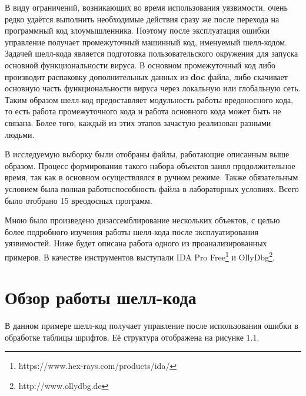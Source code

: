 В виду ограничений, возникающих во время использования уязвимости, очень редко удаётся выполнить необходимые действия сразу же после перехода на программный код злоумышленника.
Поэтому после эксплуатация ошибки управление получает промежуточный машинный код, именуемый шелл-кодом.
Задачей шелл-кода является подготовка пользовательского окружения для запуска основной функциональности вируса.
В основном промежуточный код либо производит распаковку дополнительных данных из \textbf{doc} файла, либо скачивает основную часть функциональности вируса через локальную или глобальную сеть.
Таким образом шелл-код предоставляет модульность работы вредоносного кода, то есть работа промежуточного кода и работа основного кода может быть не связана.
Более того, каждый из этих этапов зачастую реализован разными людьми.

В исследуемую выборку были отобраны файлы, работающие описанным выше образом.
Процесс формирования такого набора объектов занял продолжительное время, так как в основном осуществлялся в ручном режиме.
Также обязательным условием была полная работоспособность файла в лабораторных условиях.
Всего было отобрано 15 вреодосных программ.

Мною было произведено дизассемблирование нескольких объектов, с целью более подробного изучения работы шелл-кода после эксплуатирования уязвимостей.
Ниже будет описана работа одного из проанализированных примеров.
В качестве инструментов выступали IDA Pro Free\footnote{https://www.hex-rays.com/products/ida/} и OllyDbg\footnote{http://www.ollydbg.de}.

\newpage
\section{Обзор работы шелл-кода}

В данном примере шелл-код получает управление после использования ошибки в обработке таблицы шрифтов.
Её структура отображена на рисунке 1.1. 

